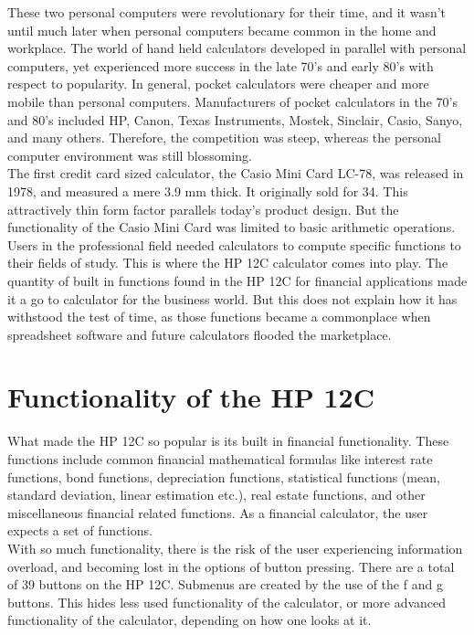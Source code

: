 \documentclass{article}
\begin{document}
These two personal computers were revolutionary for their time, and it wasn’t until much later when personal computers became common in the home and workplace.  The world of hand held calculators developed in parallel with personal computers, yet experienced more success in the late 70’s and early 80’s with respect to popularity.  In general, pocket calculators were cheaper and more mobile than personal computers.  Manufacturers of pocket calculators in the 70’s and 80’s included HP, Canon, Texas Instruments, Mostek, Sinclair, Casio, Sanyo, and many others.  Therefore, the competition was steep, whereas the personal computer environment was still blossoming.\\

The first credit card sized calculator, the Casio Mini Card LC-78, was released in 1978, and measured a mere 3.9 mm thick.  It originally sold for 34.  This attractively thin form factor parallels today’s product design.  But the functionality of the Casio Mini Card was limited to basic arithmetic operations.  Users in the professional field needed calculators to compute specific functions to their fields of study.  This is where the HP 12C calculator comes into play.  The quantity of built in functions found in the HP 12C for financial applications made it a go to calculator for the business world.  But this does not explain how it has withstood the test of time, as those functions became a commonplace when spreadsheet software and future calculators flooded the marketplace.


\section{Functionality of the HP 12C}
\label{Functionality of the HP 12C}

What made the HP 12C so popular is its built in financial functionality.  These functions include common financial mathematical formulas like interest rate functions, bond functions, depreciation functions, statistical functions (mean, standard deviation, linear estimation etc.), real estate functions, and other miscellaneous financial related functions.  As a financial calculator, the user expects a set of functions.\\

With so much functionality, there is the risk of the user experiencing information overload, and becoming lost in the options of button pressing.  There are a total of 39 buttons on the HP 12C.  Submenus are created by the use of the f and g buttons.  This hides less used functionality of the calculator, or more advanced functionality of the calculator, depending on how one looks at it.\\
\end{document}
